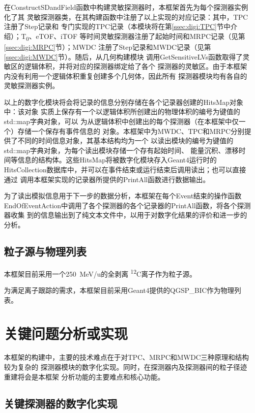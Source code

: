 \documentclass[bachelor,openany,oneside,color]{buaathesis}
\def\TZ{T\textsubscript{0}}
\def\PrimaryParticle{\textsuperscript{12}C}
\begin{document}
在ConstructSDandField函数中构建灵敏探测器时，本框架首先为每个探测器实例化了其
灵敏探测器类，在其构建函数中注册了以上实现的对应记录：其中，TPC注册了Step记录和
专门实现的TPC记录（本模块将在第\ref{ssec:digi:TPC}节中介绍）；\TZ、eTOF、iTOF
等时间灵敏探测器注册了起始时间和MRPC记录（见第\ref{ssec:digi:MRPC}节）；MWDC
注册了Step记录和MWDC记录（见第\ref{ssec:digi:MWDC}节）。随后，从几何构建模块
调用GetSensitiveLVs函数取得了灵敏区的逻辑体积，并将对应的探测器绑定给了各个
探测器的灵敏区。由于本框架内没有利用一个逻辑体积重复创建多个几何体，因此所有
探测器模块均有各自的灵敏探测器实例。

以上的数字化模块将会将记录的信息分别存储在各个记录器创建的HitsMap对象中：该对象
实质上保存有一个以逻辑体积所创建出的物理体积的编号为键值的std::map字典对象，可以
为从逻辑体积中创建出的每个探测器（在本框架中仅一个）存储一个保存有事件信息的
对象。本框架中为MWDC、TPC和MRPC分别提供了不同的时间信息对象，其基本结构均为一个
以读出模块的编号为键值的std::map字典对象，为每个读出模块存储一个存有起始时间、
能量沉积、漂移时间等信息的结构体。这些HitsMap将被数字化模块存入Geant4运行时的
HitsCollection数据库中，并可以在事件结束或运行结束后调用读出；也可以直接通过
调用本框架实现的记录器所提供的PrintAll函数进行数据输出。

为了读出模拟信息用于下一步的数据分析，本框架在每个Event结束的操作函数
EndOfEventAction中调用了各个探测器的各个记录器的PrintAll函数，将各个探测器收集
到的信息输出到了纯文本文件中，以用于对数字化结果的评价和进一步的分析。

\section{粒子源与物理列表}

本框架目前采用一个\SI{250}{\MeV/u}的全剥离 \PrimaryParticle 离子作为粒子源。

为满足离子跟踪的需求，本框架目前采用Geant4提供的QGSP\_BIC作为物理列表。

\chapter{关键问题分析或实现}

本框架的构建中，主要的技术难点在于对TPC、MRPC和MWDC三种原理和结构较为复杂的
探测器模块的数字化实现。同时，在探测器内及探测器间的粒子径迹重建将会是本框架
分析功能的主要难点和核心功能。

\section{关键探测器的数字化实现}\label{sec:digi}
\end{document}
